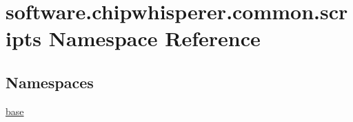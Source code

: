 \hypertarget{namespacesoftware_1_1chipwhisperer_1_1common_1_1scripts}{}\section{software.\+chipwhisperer.\+common.\+scripts Namespace Reference}
\label{namespacesoftware_1_1chipwhisperer_1_1common_1_1scripts}
\subsection*{Namespaces}
\begin{DoxyCompactItemize}
\item 
 \hyperlink{namespacesoftware_1_1chipwhisperer_1_1common_1_1scripts_1_1base}{base}
\end{DoxyCompactItemize}
